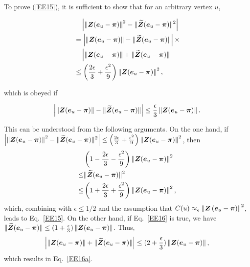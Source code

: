 \documentclass[10pt,twocolumn,twoside]{IEEEtran}
\begin{document}
\begin{IEEEproof}
    To prove (\ref{EE15}), it is sufficient  to show that for an arbitrary vertex \(u\),
    \begin{small}
        \begin{align}\label{EE16a}
             & \quad \left|\left\Vert\boldsymbol{Z}(\boldsymbol{e}_u-\boldsymbol{\pi})\right\Vert^2-\|{\widetilde{\boldsymbol{Z}}(\boldsymbol{e}_u-\boldsymbol{\pi})}\|^2 \right|\nonumber \\
             & =
            \left|\left\Vert\boldsymbol{Z}(\boldsymbol{e}_u-\boldsymbol{\pi})\right\Vert-\|\widetilde{\boldsymbol{Z}}(\boldsymbol{e}_u-\boldsymbol{\pi})\| \right|\times \nonumber         \\
             & \quad\left|\left\Vert\boldsymbol{Z}(\boldsymbol{e}_u-\boldsymbol{\pi})\right\Vert+\|\widetilde{\boldsymbol{Z}}(\boldsymbol{e}_u-\boldsymbol{\pi})\| \right| \nonumber       \\
             & \le
            \left(\frac{2\epsilon}{3}+\frac{\epsilon^2}{9}\right)\left\Vert\boldsymbol{Z}(\boldsymbol{e}_u-\boldsymbol{\pi})\right\Vert^2,
        \end{align}
    \end{small}
    which is obeyed if
    \begin{small}
        \begin{equation}\label{EE16}
            \left|\left\Vert\boldsymbol{Z}(\boldsymbol{e}_u-\boldsymbol{\pi})\right\Vert-\|\widetilde{\boldsymbol{Z}}(\boldsymbol{e}_u-\boldsymbol{\pi})\| \right| \le
            \frac{\epsilon}{3}\left\Vert\boldsymbol{Z}(\boldsymbol{e}_u-\boldsymbol{\pi})\right\Vert.
        \end{equation}
    \end{small}
    This can be understood from the following arguments. On the one hand, if
    {\footnotesize \(\left|\left\Vert\boldsymbol{Z}(\boldsymbol{e}_u-\boldsymbol{\pi})\right\Vert^2-\|{\widetilde{\boldsymbol{Z}}(\boldsymbol{e}_u-\boldsymbol{\pi})}\|^2 \right| \le \left(\frac{2\epsilon}{3}+\frac{\epsilon^2}{9}\right)\left\Vert\boldsymbol{Z}(\boldsymbol{e}_u-\boldsymbol{\pi})\right\Vert^2\)}, then
    \begin{align*}
            & \left(1-\frac{2\epsilon}{3}-\frac{\epsilon^2}{9}\right)\left\Vert\boldsymbol{Z}(\boldsymbol{e}_u-\boldsymbol{\pi})\right\Vert^2  \\
        \le & \|{\widetilde{\boldsymbol{Z}}(\boldsymbol{e}_u-\boldsymbol{\pi})}\|^2                                                      \\
        \le & \left(1+\frac{2\epsilon}{3}+\frac{\epsilon^2}{9}\right)\left\Vert\boldsymbol{Z}(\boldsymbol{e}_u-\boldsymbol{\pi})\right\Vert^2,
    \end{align*}
    which, combining with \(\epsilon \le 1/2\) and the assumption that \(C(u)\approx_\epsilon\left\Vert\boldsymbol{Z}\left( \boldsymbol{e}_u-\boldsymbol{\pi} \right)\right\Vert^2\), leads to Eq.~\eqref{EE15}.
    On the other hand, if Eq.~\eqref{EE16} is true, we have \(\|\widetilde{\boldsymbol{Z}}(\boldsymbol{e}_u-\boldsymbol{\pi})\| \le (1+\frac{\epsilon}{3})\left\Vert\boldsymbol{Z}(\boldsymbol{e}_u-\boldsymbol{\pi})\right\Vert\). Thus,
    \begin{equation*}
        \left|\left\Vert\boldsymbol{Z}(\boldsymbol{e}_u-\boldsymbol{\pi})\right\Vert+\|\widetilde{\boldsymbol{Z}}(\boldsymbol{e}_u-\boldsymbol{\pi})\| \right| \le (2+\frac{\epsilon}{3})\left\Vert\boldsymbol{Z}(\boldsymbol{e}_u-\boldsymbol{\pi})\right\Vert,
    \end{equation*}
    which results in Eq.~\eqref{EE16a}.


\end{IEEEproof}
\end{document}
